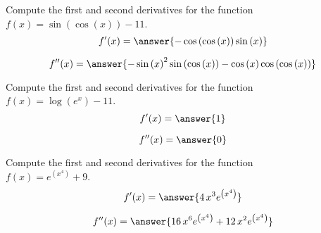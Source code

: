 \documentclass[]{ximera}
\begin{document}

\renewcommand{\latexProblemContent}[1]{#1}


\latexProblemContent{
\begin{problem}

Compute the first and second derivatives for the function\\ $f(x)={\sin\left(\cos\left(x\right)\right) - 11}$.\\



\[f'(x)=\answer{-\cos\left(\cos\left(x\right)\right) \sin\left(x\right)}\]

\[f''(x)=\answer{-\sin\left(x\right)^{2} \sin\left(\cos\left(x\right)\right) - \cos\left(x\right) \cos\left(\cos\left(x\right)\right)}\] 
\end{problem}}%





\latexProblemContent{
\begin{problem}

Compute the first and second derivatives for the function\\ $f(x)={\log\left(e^{x}\right) - 11}$.\\



\[f'(x)=\answer{1}\]

\[f''(x)=\answer{0}\] 
\end{problem}}%





\latexProblemContent{
\begin{problem}

Compute the first and second derivatives for the function\\ $f(x)={e^{\left(x^{4}\right)} + 9}$.\\



\[f'(x)=\answer{4 \, x^{3} e^{\left(x^{4}\right)}}\]

\[f''(x)=\answer{16 \, x^{6} e^{\left(x^{4}\right)} + 12 \, x^{2} e^{\left(x^{4}\right)}}\] 
\end{problem}}%
\end{document}
